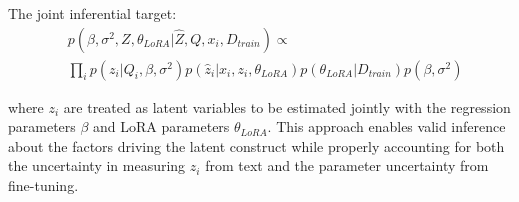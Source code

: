 \documentclass[11pt]{article}
\begin{document}
The joint inferential target:
\begin{align}
&p(\beta, \sigma^2, Z, \theta_{LoRA}|\hat{Z}, Q, x_i, D_{train}) \propto \label{eq:joint_target2} \\
&\prod_i p(z_i|Q_i, \beta, \sigma^2)p(\hat{z}_i|x_i, z_i, \theta_{LoRA})p(\theta_{LoRA}|D_{train})p(\beta, \sigma^2) \nonumber
\end{align}

where $z_i$ are treated as latent variables to be estimated jointly with the regression parameters $\beta$ and LoRA parameters $\theta_{LoRA}$. This approach enables valid inference about the factors driving the latent construct while properly accounting for both the uncertainty in measuring $z_i$ from text and the parameter uncertainty from fine-tuning.

\newpage

\end{document}
